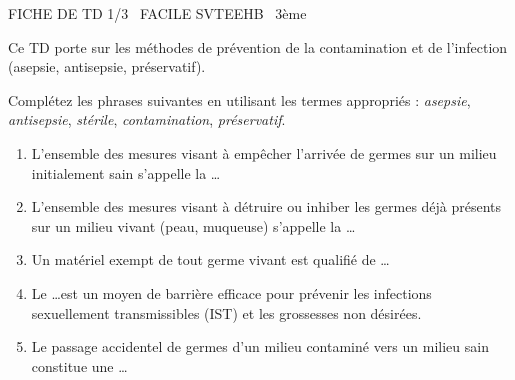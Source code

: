 \documentclass[11pt]{article}
\begin{document}
\begin{tcolorbox}[enhanced,colback=popink,colframe=popink,arc=10pt,boxrule=0pt,left=12pt,right=12pt,top=9pt,bottom=9pt]
{\color{white}\popxbold\small FICHE DE TD 1/3 \textbullet\ FACILE \hfill SVTEEHB \textbullet\ 3ème\par}
\end{tcolorbox}
\vspace{4pt}
Ce TD porte sur les méthodes de prévention de la contamination et de l'infection (asepsie, antisepsie, préservatif).

\begin{exercice}
Complétez les phrases suivantes en utilisant les termes appropriés : \textit{asepsie}, \textit{antisepsie}, \textit{stérile}, \textit{contamination}, \textit{préservatif}.
\begin{enumerate}
    \item L'ensemble des mesures visant à empêcher l'arrivée de germes sur un milieu initialement sain s'appelle la \ldots
    \item L'ensemble des mesures visant à détruire ou inhiber les germes déjà présents sur un milieu vivant (peau, muqueuse) s'appelle la \ldots
    \item Un matériel exempt de tout germe vivant est qualifié de \ldots
    \item Le \ldots est un moyen de barrière efficace pour prévenir les infections sexuellement transmissibles (IST) et les grossesses non désirées.
    \item Le passage accidentel de germes d'un milieu contaminé vers un milieu sain constitue une \ldots
\end{enumerate}
\end{exercice}
\end{document}
